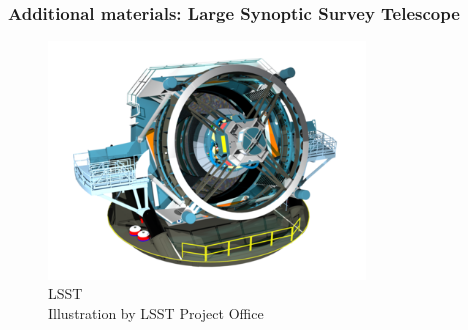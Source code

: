 \documentclass[xcolor={dvipsnames}]{beamer}
\begin{document}
\begin{frame}
\frametitle{Additional materials: Large Synoptic Survey Telescope}

\begin{figure}[h]
    \centering
    \includegraphics[width=0.75\textwidth]{fig/static/lsst.png}
        \caption{LSST\\\tiny{Illustration by LSST Project Office}}
    \label{fig:lsst}
\end{figure}

\end{frame}
\end{document}
